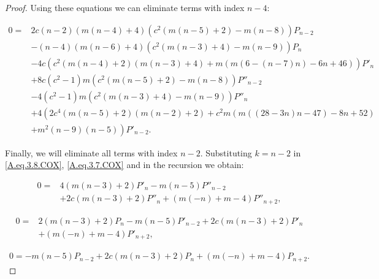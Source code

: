 \documentclass[review,nopreprintline]{elsarticle}
\theoremstyle{definition}
\numberwithin{equation}{section}
\theoremstyle{remark}
\begin{document}
\begin{proof}
	       Using these equations we can eliminate terms with index $n-4$:
	       
	        \begin{align}
	            0=&2 c (n-2) (m (n-4)+4) \left(c^2 (m (n-5)+2)-m (n-8)\right) P_{n-2} \nonumber\\
	            &-(n-4) (m (n-6)+4) \left(c^2 (m (n-3)+4)-m (n-9)\right) P_n \nonumber\\
	            &-4 c \left(c^2 (m (n-4)+2) (m (n-3)+4)+m (m (6-(n-7) n)-6 n+46)\right)  P'_n \nonumber\\
	            &+8 c \left(c^2-1\right) m \left(c^2 (m (n-5)+2)-m (n-8)\right) P''_{n-2} \nonumber\\
	            &-4 \left(c^2-1\right) m \left(c^2 (m (n-3)+4)-m (n-9)\right) P''_n \nonumber\\
	            &+4 \left(2 c^4 (m (n-5)+2) (m (n-2)+2)+c^2 m (m ((28-3 n) n-47)-8 n+52)\right.\nonumber\\
	            &\left.+m^2 (n-9) (n-5)\right) P'_{n-2}.\label{A.eq.3.14.Cox}
	        \end{align}
	        
	      Finally, we will eliminate all terms with index $n-2$. Substituting $k=n-2$ in \eqref{A.eq.3.8.COX}, \eqref{A.eq.3.7.COX} and in the recursion we obtain:
	      
	     
	        \begin{align*}
	            0=&4 (m (n-3)+2)  P'_n -m (n-5) P''_{n-2} \\
	            &+2 c (m (n-3)+2) P''_n +(m (-n)+m-4) P''_{n+2},
	        \end{align*}
	              
	        \begin{align*}
	            0=&2 (m (n-3)+2) P_n -m (n-5) P'_{n-2} +2 c (m (n-3)+2)  P'_n \\
	            &+(m (-n)+m-4) P'_{n+2},
	        \end{align*}
	       
	        \begin{align*}
	            0=-m (n-5) P_{n-2} +2 c (m (n-3)+2) P_n +(m (-n)+m-4) P_{n+2}.
	        \end{align*}
	   

\end{proof}
\end{document}
